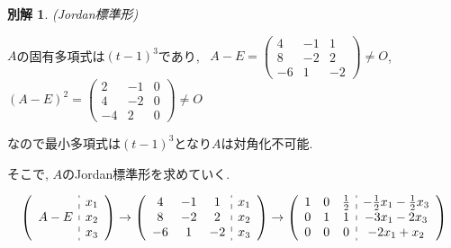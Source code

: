 \documentclass{jsarticle}
\newtheorem*{another*}{別解}
\begin{document}
\bigskip
\bigskip

\begin{another*}
(Jordan標準形)
\end{another*}
$A$の固有多項式は$(t-1)^3$であり, \ 
$A-E=\left(\begin{array}{ccc}
4 & -1 & 1 \\
8 & -2 & 2 \\
-6 & 1 & -2
\end{array}\right) \neq O$, \ \ 
$(A-E)^2=\left(\begin{array}{ccc}
2 & -1 & 0 \\
4 & -2 & 0 \\
-4 & 2 & 0
\end{array}\right) \neq O$

なので最小多項式は$(t-1)^3$となり$A$は対角化不可能.

そこで, $A$のJordan標準形を求めていく.

$$
\begin{gathered}
\left(\begin{array}{c:c}
    & x_1 \\
A-E & x_2 \\
    & x_3
\end{array}\right) \rightarrow
\left(\begin{array}{ccc:c}
4 & -1 & 1 & x_1 \\
8 & -2 & 2 & x_2 \\
-6 & 1 & -2 & x_3
\end{array}\right) \rightarrow
\left(\begin{array}{ccc:c}
1 & 0 & \frac{1}{2} & -\frac{1}{2} x_1-\frac{1}{2} x_3 \\
0 & 1 & 1 & -3 x_1-2 x_3 \\
0 & 0 & 0 & -2 x_1+x_2
\end{array}\right) \\
\end{gathered}
$$
\end{document}
